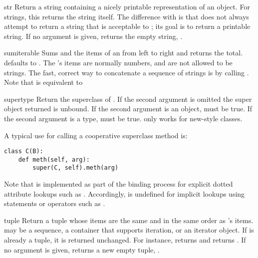 \begin{funcdesc}{str}{}
  Return a string containing a nicely printable representation of an
  object.  For strings, this returns the string itself.  The
  difference with  is that
   does not always attempt to return a string
  that is acceptable to ; its goal is to return a
  printable string.  If no argument is given, returns the empty
  string, .
\end{funcdesc}

\begin{funcdesc}{sum}{iterable}
  Sums  and the items of an  from left to
  right and returns the total.   defaults to .
  The 's items are normally numbers, and are not allowed
  to be strings.  The fast, correct way to concatenate a sequence of
  strings is by calling .
  Note that  is equivalent to
\end{funcdesc}

\begin{funcdesc}{super}{type}
  Return the superclass of .  If the second argument is omitted
  the super object returned is unbound.  If the second argument is an
  object,  must be true.  If
  the second argument is a type,  must be true.
   only works for new-style classes.

  A typical use for calling a cooperative superclass method is:
\begin{verbatim}
class C(B):
    def meth(self, arg):
        super(C, self).meth(arg)
\end{verbatim}

  Note that  is implemented as part of the binding process for
  explicit dotted attribute lookups such as
  .  Accordingly,  is
  undefined for implicit lookups using statements or operators such as
  .
\end{funcdesc}

\begin{funcdesc}{tuple}{}
  Return a tuple whose items are the same and in the same order as
  's items.   may be a sequence, a
  container that supports iteration, or an iterator object.
  If  is already a tuple, it
  is returned unchanged.  For instance,  returns
   and  returns
  .  If no argument is given, returns a new empty
  tuple, \code{()}.
\end{funcdesc}

